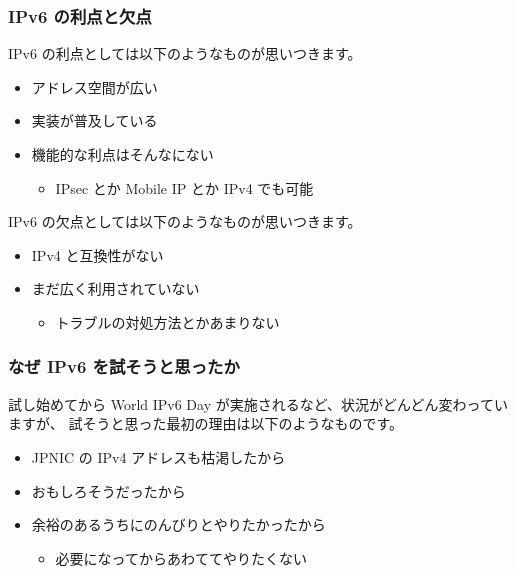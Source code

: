 \documentclass[mingoth,a4paper]{jsarticle}
\begin{document}
\subsubsection{IPv6 の利点と欠点}

IPv6 の利点としては以下のようなものが思いつきます。

\begin{itemize}
\item アドレス空間が広い
\item 実装が普及している
\item 機能的な利点はそんなにない

\begin{itemize}
\item IPsec とか Mobile IP とか IPv4 でも可能
\end{itemize}

\end{itemize}


IPv6 の欠点としては以下のようなものが思いつきます。

\begin{itemize}
\item IPv4 と互換性がない
\item まだ広く利用されていない

\begin{itemize}
\item トラブルの対処方法とかあまりない
\end{itemize}

\end{itemize}
\subsubsection{なぜ IPv6 を試そうと思ったか}

試し始めてから World IPv6 Day が実施されるなど、状況がどんどん変わっていますが、
試そうと思った最初の理由は以下のようなものです。

\begin{itemize}
\item JPNIC の IPv4 アドレスも枯渇したから
\item おもしろそうだったから
\item 余裕のあるうちにのんびりとやりたかったから

\begin{itemize}
\item 必要になってからあわててやりたくない
\end{itemize}

\end{itemize}
\end{document}

